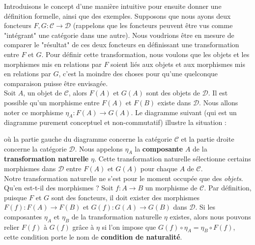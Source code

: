 \documentclass{article}
\begin{document}
Introduisons le concept d'une manière intuitive pour ensuite donner une définition formelle, ainsi que des exemples. Supposons que nous ayons deux foncteurs $F, G:\mathcal C\to\mathcal D$ (rappelons que les foncteurs peuvent être vus comme "intégrant" une catégorie dans une autre). Nous voudrions être en mesure de comparer le "résultat" de ces deux foncteurs en définissant une transformation entre $F$ et $G$. Pour définir cette transformation, nous voulons que les objets et les morphismes mis en relations par $F$ soient liés aux objets et aux morphismes mis en relations par $G$, c'est la moindre des choses pour qu'une quelconque comparaison puisse être envisagée.\\

Soit $A$, un objet de $\mathcal C$, alors $F(A)$ et $G(A)$ sont des objets de $\mathcal D$. Il est possible qu'un morphisme entre $F(A)$ et $F(B)$ existe dans $\mathcal D$. Nous allons noter ce morphisme $\eta_A:F(A)\to G(A)$. Le diagramme suivant (qui est un diagramme purement conceptuel et non-commutatif) illustre la situation :

\begin{center}
\end{center}

\noindent
où la partie gauche du diagramme concerne la catégorie $\mathcal C$ et la partie droite concerne la catégorie $\mathcal D$. Nous appelons $\eta_A$ la \textbf{composante} $A$ de la \textbf{transformation naturelle} $\eta$. Cette transformation naturelle sélectionne certains morphismes dans $\mathcal D$ entre $F(A)$ et $G(A)$ pour chaque $A$ de $\mathcal C$.\\

Notre transformation naturelle ne s'est pour le moment occupée que des \textit{objets}. Qu'en est-t-il des morphismes ? Soit $f:A\to B$ un morphisme de $\mathcal C$. Par définition, puisque $F$ et $G$ sont des foncteurs, il doit exister des morphismes $F(f):F(A)\to F(B)$ et $G(f):G(A)\to G(B)$ dans $\mathcal D$. Si les composantes $\eta_A$ et $\eta_B$ de la transformation naturelle $\eta$ existes, alors nous pouvons relier $F(f)$ à $G(f)$ grâce à $\eta$ si l'on impose que $G(f)\circ\eta_A=\eta_B\circ F(f)$, cette condition porte le nom de \textbf{condition de naturalité}.\\
\end{document}
